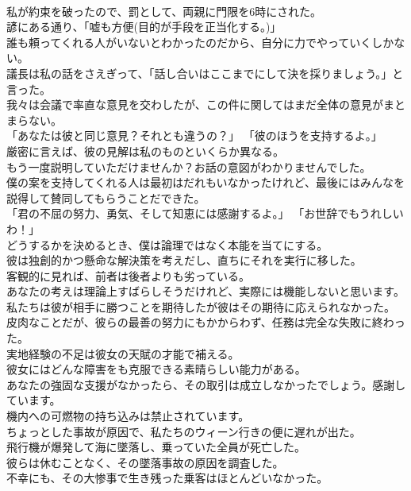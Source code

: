 \documentclass[8pt]{extreport}
\begin{document}
\begin{CJK}{UTF8}{min}
\\	私が約束を破ったので、罰として、両親に門限を6時にされた。	
\\	諺にある通り、「嘘も方便(目的が手段を正当化する。)」	
\\	誰も頼ってくれる人がいないとわかったのだから、自分に力でやっていくしかない。	
\\	議長は私の話をさえぎって、「話し合いはここまでにして決を採りましょう。」と言った。	
\\	我々は会議で率直な意見を交わしたが、この件に関してはまだ全体の意見がまとまらない。	
\\	「あなたは彼と同じ意見？それとも違うの？」 「彼のほうを支持するよ。」	
\\	厳密に言えば、彼の見解は私のものといくらか異なる。	
\\	もう一度説明していただけませんか？お話の意図がわかりませんでした。	
\\	僕の案を支持してくれる人は最初はだれもいなかったけれど、最後にはみんなを説得して賛同してもらうことだできた。	
\\	「君の不屈の努力、勇気、そして知恵には感謝するよ。」 「お世辞でもうれしいわ！」	
\\	どうするかを決めるとき、僕は論理ではなく本能を当てにする。	
\\	彼は独創的かつ懸命な解決策を考えだし、直ちにそれを実行に移した。	
\\	客観的に見れば、前者は後者よりも劣っている。	
\\	あなたの考えは理論上すばらしそうだけれど、実際には機能しないと思います。	
\\	私たちは彼が相手に勝つことを期待したが彼はその期待に応えられなかった。	
\\	皮肉なことだが、彼らの最善の努力にもかからわず、任務は完全な失敗に終わった。	
\\	実地経験の不足は彼女の天賦の才能で補える。	
\\	彼女にはどんな障害をも克服できる素晴らしい能力がある。	
\\	あなたの強固な支援がなかったら、その取引は成立しなかったでしょう。感謝しています。	
\\	機内への可燃物の持ち込みは禁止されています。	
\\	ちょっとした事故が原因で、私たちのウィーン行きの便に遅れが出た。	
\\	飛行機が爆発して海に墜落し、乗っていた全員が死亡した。	
\\	彼らは休むことなく、その墜落事故の原因を調査した。	
\\	不幸にも、その大惨事で生き残った乗客はほとんどいなかった。	

\end{CJK}
\end{document}
